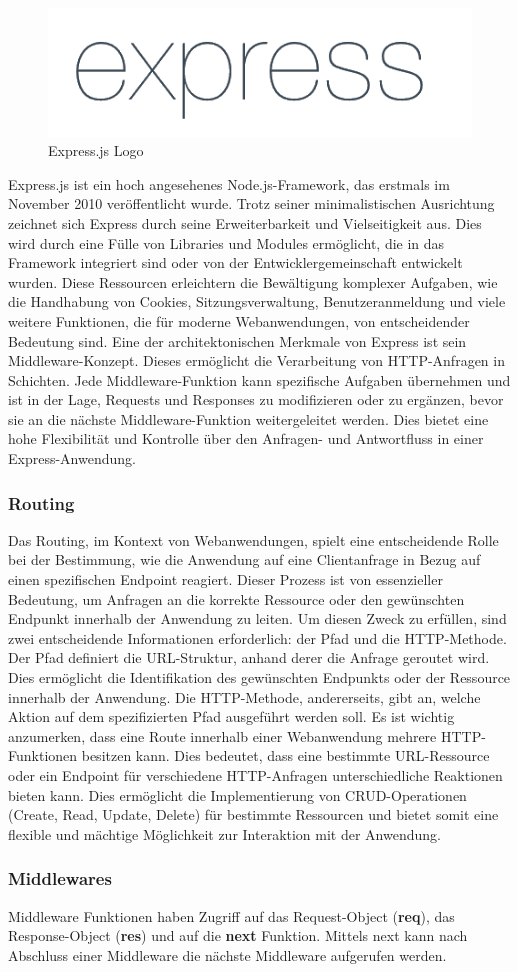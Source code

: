 \begin{figure}
    \centering
    \includegraphics[width=0.8\linewidth]{pics/express_logo.png}
    \caption{Express.js Logo}
    \label{fig:enter-label}
\end{figure}
Express.js ist ein hoch angesehenes Node.js-Framework, das erstmals im November 2010 veröffentlicht wurde. Trotz seiner minimalistischen Ausrichtung zeichnet sich Express durch seine Erweiterbarkeit und Vielseitigkeit aus. Dies wird durch eine Fülle von Libraries und Modules ermöglicht, die in das Framework integriert sind oder von der Entwicklergemeinschaft entwickelt wurden. Diese Ressourcen erleichtern die Bewältigung komplexer Aufgaben, wie die Handhabung von Cookies, Sitzungsverwaltung, Benutzeranmeldung und viele weitere Funktionen, die für moderne Webanwendungen, von entscheidender Bedeutung sind.
\newline
Eine der architektonischen Merkmale von Express ist sein Middleware-Konzept. Dieses ermöglicht die Verarbeitung von HTTP-Anfragen in Schichten. Jede Middleware-Funktion kann spezifische Aufgaben übernehmen und ist in der Lage, Requests und Responses zu modifizieren oder zu ergänzen, bevor sie an die nächste Middleware-Funktion weitergeleitet werden. Dies bietet eine hohe Flexibilität und Kontrolle über den Anfragen- und Antwortfluss in einer Express-Anwendung.

\subsubsection{Routing}
Das Routing, im Kontext von Webanwendungen, spielt eine entscheidende Rolle bei der Bestimmung, wie die Anwendung auf eine Clientanfrage in Bezug auf einen spezifischen Endpoint reagiert. Dieser Prozess ist von essenzieller Bedeutung, um Anfragen an die korrekte Ressource oder den gewünschten Endpunkt innerhalb der Anwendung zu leiten. Um diesen Zweck zu erfüllen, sind zwei entscheidende Informationen erforderlich: der Pfad und die HTTP-Methode.
\newline
Der Pfad definiert die URL-Struktur, anhand derer die Anfrage geroutet wird. Dies ermöglicht die Identifikation des gewünschten Endpunkts oder der Ressource innerhalb der Anwendung. Die HTTP-Methode, andererseits, gibt an, welche Aktion auf dem spezifizierten Pfad ausgeführt werden soll. Es ist wichtig anzumerken, dass eine Route innerhalb einer Webanwendung mehrere HTTP-Funktionen besitzen kann. Dies bedeutet, dass eine bestimmte URL-Ressource oder ein Endpoint für verschiedene HTTP-Anfragen unterschiedliche Reaktionen bieten kann. Dies ermöglicht die Implementierung von CRUD-Operationen (Create, Read, Update, Delete) für bestimmte Ressourcen und bietet somit eine flexible und mächtige Möglichkeit zur Interaktion mit der Anwendung.

\subsubsection{Middlewares}
Middleware Funktionen haben Zugriff auf das Request-Object (\textbf{req}), das Response-Object (\textbf{res}) und auf die \textbf{next} Funktion. Mittels next kann nach Abschluss einer Middleware die nächste Middleware aufgerufen werden.